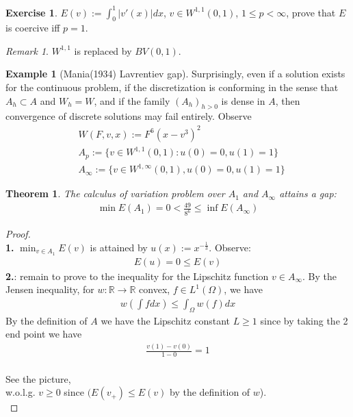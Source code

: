 \documentclass[a4paper,12pt,oneside,fleqn]{book}
\newtheorem{theorem}{Theorem}[section]
\theoremstyle{definition}
\newtheorem*{example}{Example}
\newtheorem{exercise}{Exercise}[chapter]
\theoremstyle{remark}
\newtheorem*{remark}{Remark}
\begin{document}
\begin{exercise}
	$E(v):= \int_0^1|v'(x)|dx$, $v \in W^{1, 1}(0, 1)$, $1 \le p < \infty$, prove that $E$ is coercive iff $p = 1$. 
\end{exercise}
\begin{remark}
$W^{1, 1}$ is replaced by $BV(0, 1)$. 	
\end{remark}

\begin{example}[Mania(1934) Lavrentiev gap]
Surprisingly, even if a solution exists for the continuous problem, if the discretization is conforming in the sense that $A_h \subset A$ and $W_h = W$, and if the family $(A_h)_{h>0}$ is dense in $A$, then convergence of discrete solutions may fail entirely. Observe
	\begin{align*}
		&W(F, v, x):= F^6(x - v^3)^2\\
		&A_p:= \{ v \in W^{1, 1}(0, 1): u(0) = 0, u(1) = 1\}\\
		&A_\infty := \{ v \in W^{1, \infty}(0, 1), u(0) = 0, u(1) = 1\}
	\end{align*}
\begin{theorem}
The calculus of variation problem over $A_1$ and $A_\infty$ attains a gap:
		\begin{align*}
			\min E(A_1) = 0 < \frac{49}{8^6} \le \inf E(A_\infty)
		\end{align*}
\end{theorem}
\begin{proof}\quad\\
\textbf{1.}
	$\min_{v \in A_1}E(v)$ is attained by $u(x):= x^{-\frac{1}{3}}$. Observe:
	\begin{align*}
		E(u) =0 \le E(v)
	\end{align*}
\textbf{2.}: remain to prove to the inequality for the Lipschitz function $v \in A_\infty$. By the Jensen inequality, for $w: \mathbb{R} \rightarrow \mathbb{R}$ convex, $f \in L^1(\Omega)$, we have
		\begin{align*}
			w(\int f dx) \le \int_\Omega w(f)dx
		\end{align*}
		By the definition of $A$ we have the Lipschitz constant $L \geq 1$ since by taking the 2 end point we have
		\begin{align*}
			\frac{v(1) - v(0)}{1 - 0} = 1
		\end{align*} \\
		See the picture, \\
	w.o.l.g. $v \ge 0$ since $( E(v_+) \le E(v)$ by the definition of $w$).\\ 

\end{proof}
\end{example}
\end{document}

